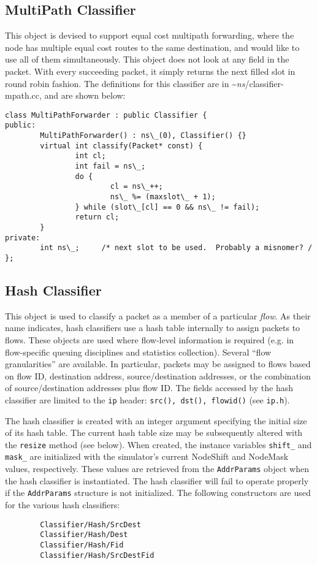 \subsection{MultiPath Classifier}
\label{sec:node:mpath-classifier}

This object is devised to support equal cost multipath
forwarding, where the node has multiple equal cost routes
to the same destination, and would like to use all of them
simultaneously.
This object does not look at any field in the packet.
With every succeeding packet, 
it simply returns the next filled slot in round robin fashion.
The definitions for this classifier are in \textasciitilde\emph{ns}/{classifier-mpath.cc},
and are shown below:
\begin{verbatim}
class MultiPathForwarder : public Classifier {
public:
        MultiPathForwarder() : ns\_(0), Classifier() {} 
        virtual int classify(Packet* const) {
                int cl;
                int fail = ns\_;
                do {
                        cl = ns\_++;
                        ns\_ %= (maxslot\_ + 1);
                } while (slot\_[cl] == 0 && ns\_ != fail);
                return cl;
        }
private:
        int ns\_;     /* next slot to be used.  Probably a misnomer? /
};
\end{verbatim}

\subsection{Hash Classifier}
\label{sec:node:hash-classifier}

This object is used to classify a packet as a member of a
particular {\em flow}.
As their name indicates,
hash classifiers use a hash table internally to assign
packets to flows.
These objects are used where flow-level information is
required (e.g. in flow-specific queuing disciplines and statistics
collection).
Several ``flow granularities'' are available.  In particular,
packets may be assigned to flows based on flow ID, destination address,
source/destination addresses, or the combination of source/destination
addresses plus flow ID.
The fields accessed by the hash classifier are limited to
the {\tt ip} header: {\tt src(), dst(), flowid()} (see {\tt ip.h}).

The hash classifier is created with an integer argument specifying
the initial size of its hash table.  The current hash table size may
be subsequently altered with the {\tt resize} method (see below).
When created, the instance variables {\tt shift\_} and {\tt mask\_}
are initialized with the simulator's current {\sf NodeShift} and
{\sf NodeMask} values, respectively.  These values are retrieved
from the {\tt AddrParams} object when the hash classifier is
instantiated.  The hash classifier will fail to operate properly if
the {\tt AddrParams} structure is not initialized.
The following constructors are used for the various hash classifiers:
\begin{verbatim}
        Classifier/Hash/SrcDest
        Classifier/Hash/Dest
        Classifier/Hash/Fid
        Classifier/Hash/SrcDestFid
\end{verbatim}

